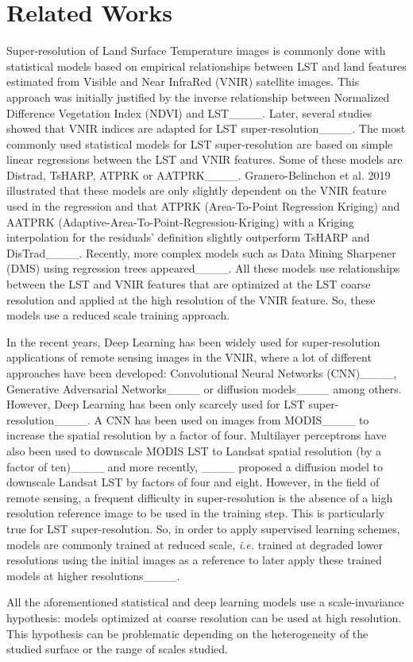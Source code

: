 \section{Related Works}
\label{sec:relatedworks}

Super-resolution of Land Surface Temperature images is commonly done with statistical models based on empirical relationships between LST and land features estimated from Visible and Near InfraRed (VNIR) satellite images. This approach was initially justified by the inverse relationship between Normalized Difference Vegetation Index (NDVI) and LST____. Later, several studies showed that VNIR indices are adapted for LST super-resolution____. The most commonly used statistical models for LST super-resolution are based on simple linear regressions between the LST and VNIR features. Some of these models are Distrad, TsHARP, ATPRK or AATPRK____. Granero-Belinchon et al. 2019 illustrated that these models are only slightly dependent on the VNIR feature used in the regression and that ATPRK (Area-To-Point Regression Kriging) and AATPRK (Adaptive-Area-To-Point-Regression-Kriging) with a Kriging interpolation for the residuals' definition slightly outperform TsHARP and DisTrad____. Recently, more complex models such as Data Mining Sharpener (DMS) using regression trees appeared____. All these models use relationships between the LST and VNIR features that are optimized at the LST coarse resolution and applied at the high resolution of the VNIR feature. So, these models use a reduced scale training approach.


In the recent years, Deep Learning has been widely used for super-resolution applications of remote sensing images in the VNIR, where a lot of different approaches have been developed: Convolutional Neural Networks (CNN)____, Generative Adversarial Networks____ or diffusion models____ among others. However, Deep Learning has been only scarcely used for LST super-resolution____. A CNN has been used on images from MODIS____ to increase the spatial resolution by a factor of four. Multilayer perceptrons have also been used to downscale MODIS LST to Landsat spatial resolution (by a factor of ten)____ and more recently, ____ proposed a diffusion model to downscale Landsat LST by factors of four and eight. However, in the field of remote sensing, a frequent difficulty in super-resolution is the absence of a high resolution reference image to be used in the training step. This is particularly true for LST super-resolution. So, in order to apply supervised learning schemes, models are commonly trained at reduced scale, \textit{i.e.} trained at degraded lower resolutions using the initial images as a reference to later apply these trained models at higher resolutions____.

All the aforementioned statistical and deep learning models use a scale-invariance hypothesis: models optimized at coarse resolution can be used at high resolution. This hypothesis can be problematic depending on the heterogeneity of the studied surface or the range of scales studied.